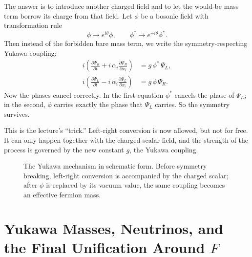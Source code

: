 The answer is to introduce another charged field and to let the would-be mass term borrow its charge from that field. Let \(\phi\) be a bosonic field with transformation rule
\begin{equation}
\phi\longrightarrow e^{i\theta}\phi,
\qquad
\phi^*\longrightarrow e^{-i\theta}\phi^*.
\end{equation}
Then instead of the forbidden bare mass term, we write the symmetry-respecting Yukawa coupling:
\begin{align}
i\left(\frac{\partial \Psi_R}{\partial t}+ i\,\alpha_i\frac{\partial \Psi_R}{\partial x_i}\right)&=g\,\phi^*\,\Psi_L,\\
i\left(\frac{\partial \Psi_L}{\partial t}- i\,\alpha_i\frac{\partial \Psi_L}{\partial x_i}\right)&=g\,\phi\,\Psi_R.
\end{align}
Now the phases cancel correctly. In the first equation \(\phi^*\) cancels the phase of \(\Psi_L\); in the second, \(\phi\) carries exactly the phase that \(\Psi_L\) carries. So the symmetry survives.

This is the lecture's ``trick.'' Left-right conversion is now allowed, but not for free. It can only happen together with the charged scalar field, and the strength of the process is governed by the new constant \(g\), the Yukawa coupling.

\begin{figure}[t]
\centering
{}
\caption{The Yukawa mechanism in schematic form. Before symmetry breaking, left-right conversion is accompanied by the charged scalar; after \(\phi\) is replaced by its vacuum value, the same coupling becomes an effective fermion mass.}
\end{figure}

\section{Yukawa Masses, Neutrinos, and the Final Unification Around \(F\)}

